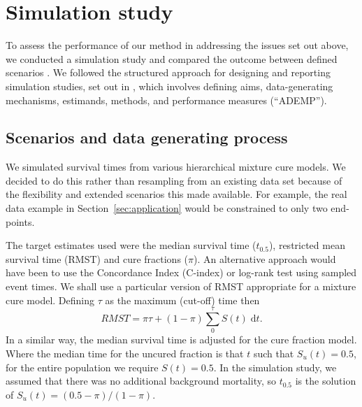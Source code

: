 \documentclass[AMA,STIX1COL]{WileyNJD-v2}
\begin{document}
%
\section{Simulation study}\label{sec:simulation}
To assess the performance of our method in addressing the issues set out above, we conducted a simulation study and compared the outcome between defined scenarios \cite{Burton2006}. We followed the structured approach for designing and reporting simulation studies, set out in \cite{Morris2019}, which involves defining aims, data-generating mechanisms, estimands, methods, and performance measures (“ADEMP”).

\subsection{Scenarios and data generating process}
We simulated survival times from various hierarchical mixture cure models. We decided to do this rather than resampling from an existing data set because of the flexibility and extended scenarios this made available. For example, the real data example in Section~\ref{sec:application} would be constrained to only two end-points.

The target estimates used were the median survival time ($t_{0.5}$), restricted mean survival time (RMST) and cure fractions ($\pi$). An alternative approach would have been to use the Concordance Index (C-index) or log-rank test using sampled event times. We shall use a particular version of RMST appropriate for a mixture cure model. Defining $\tau$ as the maximum (cut-off) time then
$$
RMST = \pi \tau + (1-\pi) \sum_0^{\tau} S(t)\; \text{d}t.
$$
In a similar way, the median survival time is adjusted for the cure fraction model. Where the median time for the uncured fraction is that $t$ such that $S_u(t) = 0.5$, for the entire population we require $S(t) = 0.5$. In the simulation study, we assumed that there was no additional background mortality, so $t_{0.5}$ is the solution of $S_u(t) = (0.5 - \pi) / (1 - \pi)$.
\end{document}
